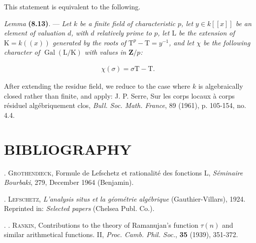 \documentclass[10pt,leqno]{article}
\begin{document}
\noindent This statement is equivalent to the following.\par

\noindent \emph{Lemma} \textbf{(8.13)}. — {\itshape Let \(k\) be a finite field of characteristic \(p\), let \(y \in  k[[x]]\) be an element of valuation \(d\), with \(d\) relatively prime to \(p\), let \(\mathrm{L}\) be the extension of \(\mathrm{K} = k((x))\) generated by the roots of \(\mathrm{T}^{p}-\mathrm{T} = y^{-1}\), and let \(\chi \) be the following character of \(\operatorname{Gal}(\mathrm{L}/\mathrm{K})\) with values in \(\mathbf{Z}/p\):}\par

\begin{equation*}\begin{gathered}\chi (\sigma ) = \sigma \mathrm{T}-\mathrm{T}.\end{gathered}\end{equation*}

\par

\noindent After extending the residue field, we reduce to the case where \(k\) is algebraically closed rather than finite, and apply: J. P. Serre, Sur les corps locaux à corps résiduel algébriquement clos, \emph{Bull. Soc. Math. France}, 89 (1961), p. 105-154, no. 4.4.\par

\section*{BIBLIOGRAPHY}

\noindent [\(1] \). \textsc{Grothendieck}, Formule de Lefschetz et rationalité des fonctions \(\mathrm{L}\), \emph{Séminaire Bourbaki}, 279, December 1964 (Benjamin).\par

\noindent [\(2] \). \textsc{Lefschetz}, \emph{L'analysis situs et la géométrie algébrique} (Gauthier-Villars), 1924. Reprinted in: \emph{Selected papers} (Chelsea Publ. Co.).\par

\noindent [\(3] . \). \textsc{Rankin}, Contributions to the theory of Ramanujan's function \(\tau (n)\) and similar arithmetical functions. II, \emph{Proc. Camb. Phil. Soc.}, \textbf{35} (1939), 351-372.\par

\clearpage
\end{document}
